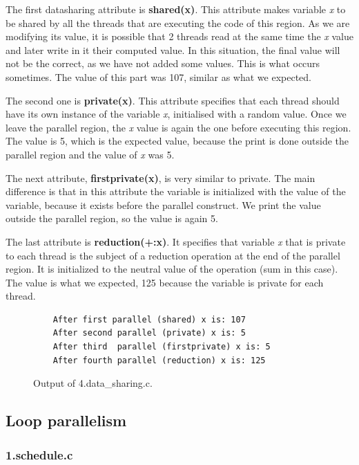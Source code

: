 \documentclass[12pt, a4paper]{article}
\begin{document}
The first datasharing attribute is \textbf{shared(x)}. This attribute makes variable \textit{x} to be shared by all the threads that are executing the code of this region. As we are modifying its value, it is possible that 2 threads read at the same time the \textit{x} value and later write in it their computed value. In this situation, the final value will not be the correct, as we have not added some values. This is what occurs sometimes. The value of this part was 107, similar as what we expected.

The second one is \textbf{private(x)}. This attribute specifies that each thread should have its own instance of the variable \textit{x}, initialised with a random value. Once we leave the parallel region, the \textit{x} value is again the one before executing this region. The value is 5, which is the expected value, because the print is done outside the parallel region and the value of \textit{x} was 5.

The next attribute, \textbf{firstprivate(x)}, is very similar to private. The main difference is that in this attribute the variable is initialized with the value of the variable, because it exists before the parallel construct. We print the value outside the parallel region, so the value is again 5.

The last attribute is \textbf{reduction(+:x)}. It specifies that variable \textit{x} that is private to each thread is the subject of a reduction operation at the end of the parallel region. It is initialized to the neutral value of the operation (sum in this case). The value is what we expected, 125 because the variable is private for each thread.

\begin{figure} [H]
	\begin{lstlisting}
	After first parallel (shared) x is: 107
	After second parallel (private) x is: 5
	After third  parallel (firstprivate) x is: 5
	After fourth parallel (reduction) x is: 125
	\end{lstlisting}
	\caption{Output of 4.data\_sharing.c.}
\end{figure}

\subsection{Loop parallelism}

\subsubsection{1.schedule.c}
\end{document}
